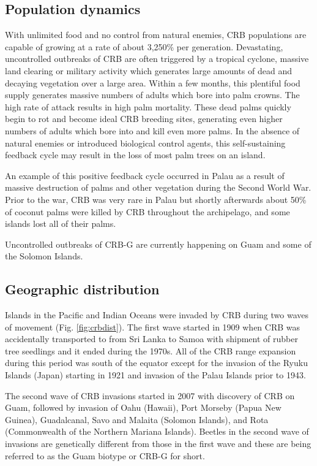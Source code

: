 \documentclass[twocolumn,letterpaper]{scrartcl}
\begin{document}
\subsection{Population dynamics}

With unlimited food and no control from natural enemies, CRB populations are capable of growing at a rate of about 3,250\% per generation. Devastating, uncontrolled outbreaks of CRB are often triggered by a tropical cyclone, massive land clearing or military activity which generates large amounts of dead and decaying vegetation over a large area. Within a few months, this plentiful food supply generates massive numbers of adults which bore into palm crowns. The high rate of attack results in high palm mortality. These dead palms quickly begin to rot and become ideal CRB breeding sites, generating even higher numbers of adults which bore into and kill even more palms. In the absence of natural enemies or introduced biological control agents, this self-sustaining feedback cycle may result in the loss of most palm trees on an island. 

An example of this positive feedback cycle occurred in Palau as a result of massive destruction of palms and other vegetation during the Second World War. Prior to the war, CRB was very rare in Palau but shortly afterwards about 50\% of coconut palms were killed by CRB throughout the archipelago, and some islands lost all of their palms.

Uncontrolled outbreaks of CRB-G are currently happening on Guam and some of the Solomon Islands.

\subsection{Geographic distribution}

Islands in the Pacific and Indian Oceans were invaded by CRB during two waves of movement (Fig. \ref{fig:crbdist}). The first wave started in 1909 when CRB was accidentally transported to from Sri Lanka to Samoa with shipment of rubber tree seedlings and it ended during the 1970s. All of the CRB range expansion during this period was south of the equator except for the invasion of the Ryuku Islands (Japan) starting in 1921 and invasion of the Palau Islands prior to 1943.

The second wave of CRB invasions started in 2007 with discovery of CRB on Guam, followed by invasion of Oahu (Hawaii), Port Morseby (Papua New Guinea), Guadalcanal, Savo and Malaita (Solomon Islands), and Rota (Commonwealth of the Northern Mariana Islands). Beetles in the second wave of invasions are genetically different from those in the first wave and these are being referred to as the Guam biotype or CRB-G for short.
\end{document}
